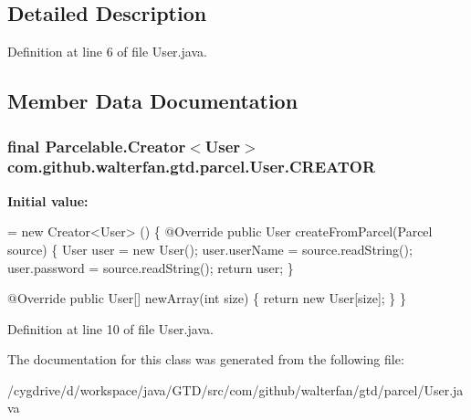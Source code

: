 \subsection{Detailed Description}


Definition at line 6 of file User.\-java.



\subsection{Member Data Documentation}
\hypertarget{classcom_1_1github_1_1walterfan_1_1gtd_1_1parcel_1_1User_a42f8199f5f8617c4026624a50ac743cc}{
\subsubsection[{C\-R\-E\-A\-T\-O\-R}]{\setlength{\rightskip}{0pt plus 5cm}final Parcelable.\-Creator$<${\bf User}$>$ com.\-github.\-walterfan.\-gtd.\-parcel.\-User.\-C\-R\-E\-A\-T\-O\-R\hspace{0.3cm}{\ttfamily [static]}}}\label{classcom_1_1github_1_1walterfan_1_1gtd_1_1parcel_1_1User_a42f8199f5f8617c4026624a50ac743cc}
{\bfseries Initial value\-:}
\begin{DoxyCode}
= \textcolor{keyword}{new} Creator<User> () \{
        @Override
        \textcolor{keyword}{public} User createFromParcel(Parcel source) \{
            User user = \textcolor{keyword}{new} User();
            user.userName = source.readString();
            user.password = source.readString();
            \textcolor{keywordflow}{return} user;
        \}
        
        @Override
        \textcolor{keyword}{public} User[] newArray(\textcolor{keywordtype}{int} size) \{
            \textcolor{keywordflow}{return} \textcolor{keyword}{new} User[size];
        \}
    \}
\end{DoxyCode}


Definition at line 10 of file User.\-java.



The documentation for this class was generated from the following file\-:\begin{DoxyCompactItemize}
\item 
/cygdrive/d/workspace/java/\-G\-T\-D/src/com/github/walterfan/gtd/parcel/User.\-java\end{DoxyCompactItemize}
